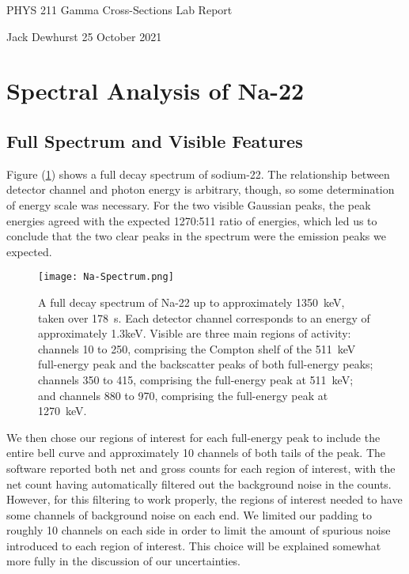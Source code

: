 \documentclass[letter]{article}
\begin{document}

\begin{center}
	{\large PHYS 211 Gamma Cross-Sections Lab Report}
	
	Jack Dewhurst \hspace{1cm}
	25 October 2021
	
	\vspace{5mm}
\end{center}
	


\section{Spectral Analysis of Na-22}

\subsection{Full Spectrum and Visible Features}


Figure (\ref{fig:NaFullSpec}) shows a full decay spectrum of sodium-22. The relationship between detector channel and photon energy is arbitrary, though, so some determination of energy scale was necessary. For the two visible Gaussian peaks, the peak energies agreed with the expected 1270:511 ratio of energies, which led us to conclude that the two clear peaks in the spectrum were the emission peaks we expected.

\begin{figure}[h] \centering
    \texttt{[image: Na-Spectrum.png]}
    \caption{A full decay spectrum of Na-22 up to approximately \qty{1350}{\kilo\electronvolt}, taken over \qty{178}{\second}. Each detector channel corresponds to an energy of approximately 1.3keV. Visible are three main regions of activity: channels 10 to 250, comprising the Compton shelf of the \qty{511}{\kilo\electronvolt} full-energy peak and the backscatter peaks of both full-energy peaks; channels 350 to 415, comprising the full-energy peak at \qty{511}{\kilo\electronvolt}; and channels 880 to 970, comprising the full-energy peak at \qty{1270}{\kilo\electronvolt}.}
    \label{fig:NaFullSpec}
\end{figure}

We then chose our regions of interest for each full-energy peak to include the entire bell curve and approximately 10 channels of both tails of the peak. The software reported both net and gross counts for each region of interest, with the net count having automatically filtered out the background noise in the counts. However, for this filtering to work properly, the regions of interest needed to have some channels of background noise on each end. We limited our padding to roughly 10 channels on each side in order to limit the amount of spurious noise introduced to each region of interest. This choice will be explained somewhat more fully in the discussion of our uncertainties.
\end{document}
